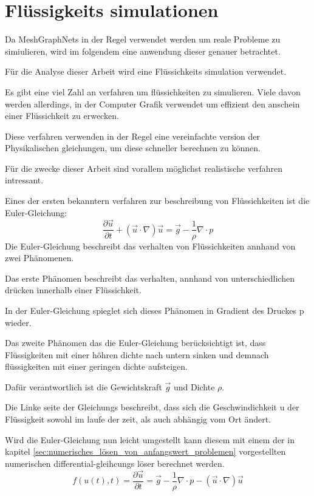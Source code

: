 
\section{Flüssigkeits simulationen} \label{sec:simulationen}

Da MeshGraphNets in der Regel verwendet werden um reale Probleme zu simiulieren, 
wird im folgendem eine anwendung dieser genauer betrachtet.

Für die Analyse dieser Arbeit wird eine Flüssichkeits simulation verwendet.

Es gibt eine viel Zahl an verfahren um flüssichkeiten zu simulieren.
Viele davon werden allerdings, in der Computer Grafik verwendet um 
effizient den anschein einer Flüssichkeit zu erwecken.

Diese verfahren verwenden in der Regel eine vereinfachte version der Physikalischen gleichungen,
um diese schneller berechnen zu können.

Für die zwecke dieser Arbeit sind vorallem möglichst realistische verfahren intressant.

Eines der ersten bekanntern verfahren zur beschreibung von Flüssichkeiten ist die Euler-Gleichung:
$$
\frac{\partial \vec{u}}{\partial t} + (\vec{u} \cdot \nabla) \vec{u} =  \vec{g} - \frac{1}{\rho} \nabla \cdot p
$$
Die Euler-Gleichung beschreibt das verhalten von Flüssichkeiten annhand von zwei Phänomenen.

Das erste Phänomen beschreibt das verhalten, annhand von unterschiedlichen drücken innerhalb einer Flüssichkeit.

In der Euler-Gleichung spieglet sich dieses Phänomen in Gradient des Druckes p wieder.

Das zweite Phänomen das die Euler-Gleichung berücksichtigt ist, dass Flüssigkeiten mit
einer höhren dichte nach untern sinken und demnach flüssigkeiten mit einer geringen dichte aufsteigen.

Dafür verantwortlich ist die Gewichtskraft $\vec{g}$ und Dichte $\rho$.

Die Linke seite der Gleichungs beschreibt, dass sich die Geschwindichkeit u der Flüssigkeit sowohl im laufe 
der zeit, als auch abhängig vom Ort ändert.

Wird die Euler-Gleichung nun leicht umgestellt kann diesem mit einem der in kapitel \ref{sec:numerisches_lösen_von_anfangswert_problemen} vorgestellten 
numerischen differential-gleihcungs löser berechnet werden.
$$
f(u(t), t) = \frac{\partial \vec{u}}{\partial t}  =  \vec{g} - \frac{1}{\rho} \nabla \cdot p -  (\vec{u} \cdot \nabla) \vec{u}
$$


